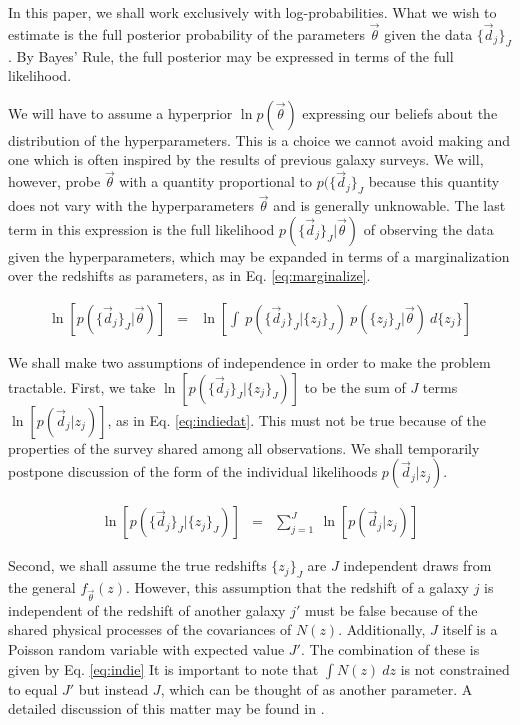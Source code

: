 \documentclass[preprint]{aastex}
\begin{document}
In this paper, we shall work exclusively with log-probabilities.  What we wish 
to estimate is the full posterior probability of the parameters $\vec{\theta}$ 
given the data $\{\vec{d}_{j}\}_{J}$.  By Bayes' Rule, the full posterior may 
be expressed in terms of the full likelihood.

We will have to assume a hyperprior $\ln p(\vec{\theta})$ expressing our 
beliefs about the distribution of the hyperparameters.  This is a choice we 
cannot avoid making and one which is often inspired by the results of previous 
galaxy surveys.  We will, however, probe $\vec{\theta}$ with a quantity 
proportional to $p(\{\vec{d}_{j}\}_{J}$ because this quantity does not vary 
with the hyperparameters $\vec{\theta}$ and is generally unknowable.  The last 
term in this expression is the full likelihood 
$p(\{\vec{d}_{j}\}_{J}|\vec{\theta})$ of observing the data given the 
hyperparameters, which may be expanded in terms of a marginalization over the 
redshifts as parameters, as in Eq. \ref{eq:marginalize}.  

\begin{eqnarray}
\label{eq:marginalize}
\ln[p(\{\vec{d}_{j}\}_{J}|\vec{\theta})] &=& \ln\left[\int\ 
p(\{\vec{d}_{j}\}_{J}|\{z_{j}\}_{J})\ p(\{z_{j}\}_{J}|\vec{\theta})\ 
d\{z_{j}\}\right]
\end{eqnarray}

We shall make two assumptions of independence in order to make the problem 
tractable.  First, we take $\ln[p(\{\vec{d}_{j}\}_{J}|\{z_{j}\}_{J})]$ to be 
the sum of $J$ terms $\ln[p(\vec{d}_{j}|z_{j})]$, as in Eq. \ref{eq:indiedat}.  
This must not be true because of the properties of the survey shared among all 
observations.  We shall temporarily postpone discussion of the form of the 
individual likelihoods $p(\vec{d}_{j}|z_{j})$.  

\begin{eqnarray}
\label{eq:indiedat}
\ln[p(\{\vec{d}_{j}\}_{J}|\{z_{j}\}_{J})] &=& \sum_{j=1}^{J}\ 
\ln[p(\vec{d}_{j}|z_{j})]
\end{eqnarray}

Second, we shall assume the true redshifts $\{z_{j}\}_{J}$ are $J$ independent 
draws from the general $f_{\vec{\theta}}(z)$.  However, this assumption that 
the redshift of a galaxy $j$ is independent of the redshift of another galaxy 
$j'$ must be false because of the shared physical processes of the covariances 
of $N(z)$.  Additionally, $J$ itself is a Poisson random variable with expected 
value $J'$.  The combination of these is given by Eq. \ref{eq:indie}  It is 
important to note that $\int N(z)\ dz$ is not constrained to equal $J'$ but 
instead $J$, which can be thought of as another parameter.  A detailed 
discussion of this matter may be found in \citet{for14}.
\end{document}
